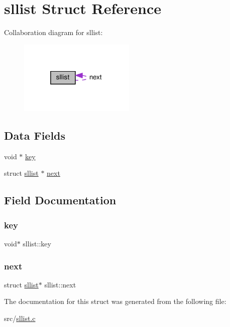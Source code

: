 \hypertarget{structsllist}{}\section{sllist Struct Reference}
\label{structsllist}


Collaboration diagram for sllist\+:\nopagebreak
\begin{figure}[H]
\begin{center}
\leavevmode
\includegraphics[width=157pt]{structsllist__coll__graph}
\end{center}
\end{figure}
\subsection*{Data Fields}
\begin{DoxyCompactItemize}
\item 
void $\ast$ \hyperlink{structsllist_aba6ff88336afdd0d2a8cb0ce396f79b6}{key}
\item 
struct \hyperlink{structsllist}{sllist} $\ast$ \hyperlink{structsllist_abd84069b1b074a7ac7d94b65672d4fd3}{next}
\end{DoxyCompactItemize}


\subsection{Field Documentation}
\mbox{\label{structsllist_aba6ff88336afdd0d2a8cb0ce396f79b6}} 
\subsubsection{\texorpdfstring{key}{key}}
{\footnotesize\ttfamily void$\ast$ sllist\+::key}

\mbox{\label{structsllist_abd84069b1b074a7ac7d94b65672d4fd3}} 
\subsubsection{\texorpdfstring{next}{next}}
{\footnotesize\ttfamily struct \hyperlink{structsllist}{sllist}$\ast$ sllist\+::next}



The documentation for this struct was generated from the following file\+:\begin{DoxyCompactItemize}
\item 
src/\hyperlink{sllist_8c}{sllist.\+c}\end{DoxyCompactItemize}
